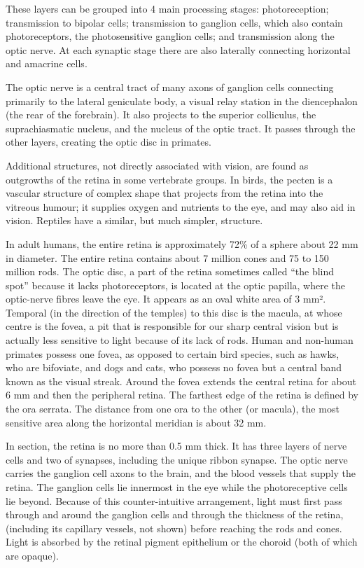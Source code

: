 These layers can be grouped into 4 main processing stages: photoreception; transmission to bipolar cells; transmission to ganglion cells, which also contain photoreceptors, the photosensitive ganglion cells; and transmission along the optic nerve. At each synaptic stage there are also laterally connecting horizontal and amacrine cells.

The optic nerve is a central tract of many axons of ganglion cells connecting primarily to the lateral geniculate body, a visual relay station in the diencephalon (the rear of the forebrain). It also projects to the superior colliculus, the suprachiasmatic nucleus, and the nucleus of the optic tract. It passes through the other layers, creating the optic disc in primates.

Additional structures, not directly associated with vision, are found as outgrowths of the retina in some vertebrate groups. In birds, the pecten is a vascular structure of complex shape that projects from the retina into the vitreous humour; it supplies oxygen and nutrients to the eye, and may also aid in vision. Reptiles have a similar, but much simpler, structure.

In adult humans, the entire retina is approximately 72\% of a sphere about 22 mm in diameter. The entire retina contains about 7 million cones and 75 to 150 million rods. The optic disc, a part of the retina sometimes called ``the blind spot'' because it lacks photoreceptors, is located at the optic papilla, where the optic-nerve fibres leave the eye. It appears as an oval white area of 3 mm². Temporal (in the direction of the temples) to this disc is the macula, at whose centre is the fovea, a pit that is responsible for our sharp central vision but is actually less sensitive to light because of its lack of rods. Human and non-human primates possess one fovea, as opposed to certain bird species, such as hawks, who are bifoviate, and dogs and cats, who possess no fovea but a central band known as the visual streak. Around the fovea extends the central retina for about 6 mm and then the peripheral retina. The farthest edge of the retina is defined by the ora serrata. The distance from one ora to the other (or macula), the most sensitive area along the horizontal meridian is about 32 mm.

In section, the retina is no more than 0.5 mm thick. It has three layers of nerve cells and two of synapses, including the unique ribbon synapse. The optic nerve carries the ganglion cell axons to the brain, and the blood vessels that supply the retina. The ganglion cells lie innermost in the eye while the photoreceptive cells lie beyond. Because of this counter-intuitive arrangement, light must first pass through and around the ganglion cells and through the thickness of the retina, (including its capillary vessels, not shown) before reaching the rods and cones. Light is absorbed by the retinal pigment epithelium or the choroid (both of which are opaque).

